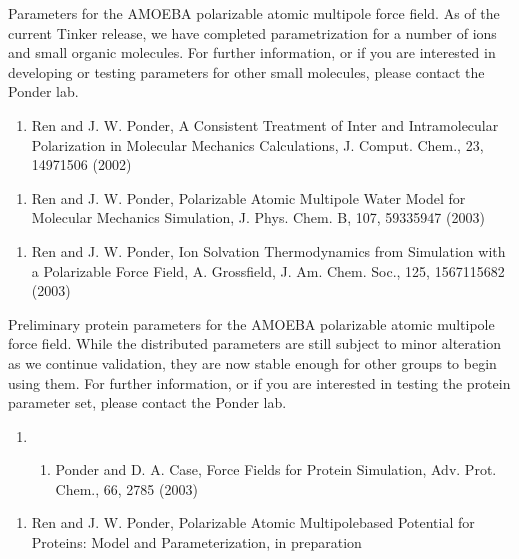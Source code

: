 \documentclass[letterpaper,11pt,english]{sphinxmanual}
\begin{document}
Parameters for the AMOEBA polarizable atomic multipole force field. As of the current Tinker release, we have completed parametrization for a number of ions and small organic molecules. For further information, or if you are interested in developing or testing parameters for other small molecules, please contact the Ponder lab.
\begin{enumerate}
%
\setcounter{enumi}{15}
\item {} 
Ren and J. W. Ponder, A Consistent Treatment of Inter\sphinxhyphen{} and Intramolecular Polarization in Molecular Mechanics Calculations, J. Comput. Chem., 23, 1497\sphinxhyphen{}1506 (2002)

\end{enumerate}
\begin{enumerate}
%
\setcounter{enumi}{15}
\item {} 
Ren and J. W. Ponder, Polarizable Atomic Multipole Water Model for Molecular Mechanics Simulation, J. Phys. Chem. B, 107, 5933\sphinxhyphen{}5947 (2003)

\end{enumerate}
\begin{enumerate}
%
\setcounter{enumi}{15}
\item {} 
Ren and J. W. Ponder, Ion Solvation Thermodynamics from Simulation with a Polarizable Force Field, A. Grossfield, J. Am. Chem. Soc., 125, 15671\sphinxhyphen{}15682 (2003)

\end{enumerate}


Preliminary protein parameters for the AMOEBA polarizable atomic multipole force field. While the distributed parameters are still subject to minor alteration as we continue validation, they are now stable enough for other groups to begin using them. For further information, or if you are interested in testing the protein parameter set, please contact the Ponder lab.
\begin{enumerate}
%
\setcounter{enumi}{9}
\item {} \begin{enumerate}
%
\setcounter{enumii}{22}
\item {} 
Ponder and D. A. Case, Force Fields for Protein Simulation, Adv. Prot. Chem., 66, 27\sphinxhyphen{}85 (2003)

\end{enumerate}

\end{enumerate}
\begin{enumerate}
%
\setcounter{enumi}{15}
\item {} 
Ren and J. W. Ponder, Polarizable Atomic Multipole\sphinxhyphen{}based Potential for Proteins: Model and Parameterization, in preparation

\end{enumerate}
\end{document}
